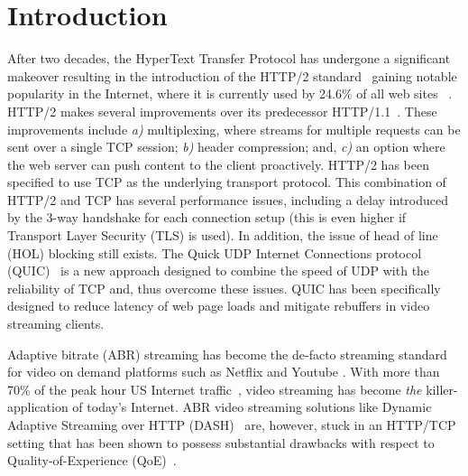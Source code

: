 \section{Introduction}
After two decades, the HyperText Transfer Protocol has undergone a significant makeover resulting in the introduction of the HTTP/2 standard~\cite{Stenberg:CCR:2014} gaining notable popularity in the Internet, where it is currently used by 24.6\% of all web sites ~\cite{http2_pop}. HTTP/2 makes several improvements over its predecessor HTTP/1.1~\cite{Fielding:RFC:1999}. These improvements include {\it a)} multiplexing, where streams for multiple requests can be sent over a single TCP session; {\it b)} header compression; and, {\it c)} an option where the web server can push content to the client proactively. HTTP/2 has been specified to use TCP as the underlying transport protocol. This combination of HTTP/2 and TCP has several performance issues, including a delay introduced by the 3-way handshake for each connection setup (this is even higher if Transport Layer Security (TLS) is used). In addition, the issue of head of line (HOL) blocking still exists. The Quick UDP Internet Connections protocol (QUIC)~\cite{Langley:SIGCOMM:2017} is a new approach designed to combine the speed of UDP with the reliability of TCP and, thus overcome these issues. QUIC has been specifically designed to reduce latency of web page loads and mitigate rebuffers in video streaming clients.

Adaptive bitrate (ABR) streaming has become the de-facto streaming standard for video on demand platforms such as Netflix \cite{netflix} and Youtube \cite{youtube}. With more than 70\% of the peak hour US Internet traffic~\cite{sandvine-16}, video streaming has become \emph{the} killer-application of today's Internet. ABR video streaming solutions like Dynamic Adaptive Streaming over HTTP (DASH)~\cite{DASH2011} are, however, stuck in an HTTP/TCP setting that has been shown to possess substantial drawbacks with respect to Quality-of-Experience (QoE)~\cite{confused-timid, WangRZ16}.

